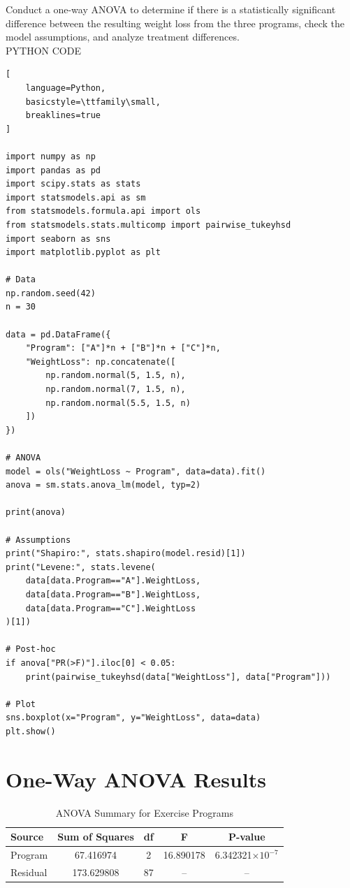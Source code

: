 \documentclass[12pt,a4paper]{report}
\begin{document}
Conduct a one-way ANOVA to determine if there is a statistically significant difference between the resulting weight loss from the three programs, check the model assumptions, and analyze treatment differences.\\ 
PYTHON CODE\\
\begin{tcolorbox}[
    enhanced,
    colback=blue!3,
    colframe=blue!70!black,
    title=One-Way ANOVA (Short Code),
    fonttitle=\bfseries,
    coltitle=white,
    colbacktitle=blue!70!black,
    arc=4pt,
    boxrule=1pt,
    breakable
]

\begin{lstlisting}[
    language=Python,
    basicstyle=\ttfamily\small,
    breaklines=true
]

import numpy as np
import pandas as pd
import scipy.stats as stats
import statsmodels.api as sm
from statsmodels.formula.api import ols
from statsmodels.stats.multicomp import pairwise_tukeyhsd
import seaborn as sns
import matplotlib.pyplot as plt

# Data
np.random.seed(42)
n = 30

data = pd.DataFrame({
    "Program": ["A"]*n + ["B"]*n + ["C"]*n,
    "WeightLoss": np.concatenate([
        np.random.normal(5, 1.5, n),
        np.random.normal(7, 1.5, n),
        np.random.normal(5.5, 1.5, n)
    ])
})

# ANOVA
model = ols("WeightLoss ~ Program", data=data).fit()
anova = sm.stats.anova_lm(model, typ=2)

print(anova)

# Assumptions
print("Shapiro:", stats.shapiro(model.resid)[1])
print("Levene:", stats.levene(
    data[data.Program=="A"].WeightLoss,
    data[data.Program=="B"].WeightLoss,
    data[data.Program=="C"].WeightLoss
)[1])

# Post-hoc
if anova["PR(>F)"].iloc[0] < 0.05:
    print(pairwise_tukeyhsd(data["WeightLoss"], data["Program"]))

# Plot
sns.boxplot(x="Program", y="WeightLoss", data=data)
plt.show()

\end{lstlisting}

\end{tcolorbox}
\section*{One-Way ANOVA Results}

\begin{table}[h!]
\centering
\caption{ANOVA Summary for Exercise Programs}
\begin{tabular}{lcccc}
\hline
\textbf{Source} & \textbf{Sum of Squares} & \textbf{df} & \textbf{F} & \textbf{P-value} \\
\hline
Program  & 67.416974 & 2  & 16.890178 & 6.342321$\times10^{-7}$ \\
Residual & 173.629808 & 87 & --        & -- \\
\hline
\end{tabular}
\end{table}
\end{document}
